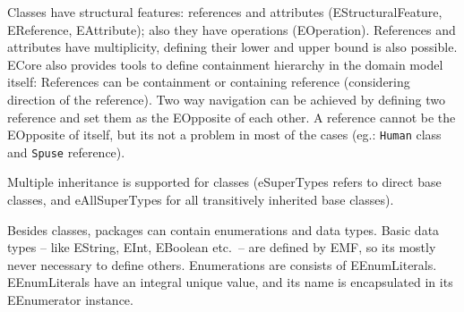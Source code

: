 Classes have structural features: references and attributes (EStructuralFeature, EReference, EAttribute); also they have operations (EOperation).
References and attributes have multiplicity, defining their lower and upper bound is also possible.
ECore also provides tools to define containment hierarchy in the domain model itself: References can be containment or containing reference (considering direction of the reference). 
Two way navigation can be achieved by defining two reference and set them as the EOpposite of each other. A reference cannot be the EOpposite of itself, but its not a problem in most of the cases (eg.: \texttt{Human} class and \texttt{Spuse} reference). 

Multiple inheritance is supported for classes (eSuperTypes refers to direct base classes, and eAllSuperTypes for all transitively inherited base classes).

Besides classes, packages can contain enumerations and data types. 
Basic data types -- like EString, EInt, EBoolean etc.\ -- are defined by EMF, so its mostly never necessary to define others.
Enumerations are consists of EEnumLiterals. 
EEnumLiterals have an integral unique value, and its name is encapsulated in its EEnumerator instance.


